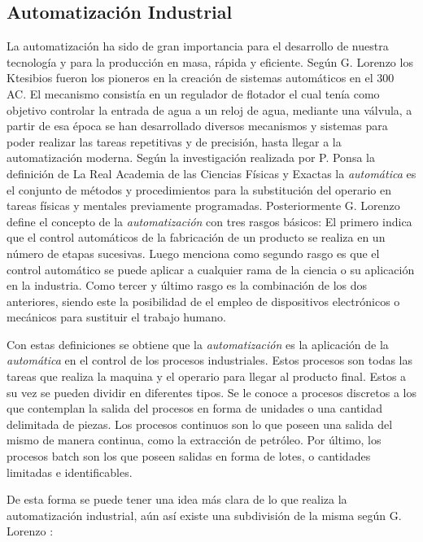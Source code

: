 \subsection*{Automatización Industrial}

La automatización ha sido de gran importancia para el desarrollo de nuestra tecnología y para la producción en masa, rápida y eficiente. Según G. Lorenzo \cite{lorenzo2009automatizacion} los Ktesibios fueron los pioneros en la creación de sistemas automáticos en el 300 AC. El mecanismo consistía en un regulador de flotador el cual tenía como objetivo controlar la entrada de agua a un reloj de agua, mediante una válvula, a partir de esa época se han desarrollado diversos mecanismos y sistemas para poder realizar las tareas repetitivas y de precisión, hasta llegar a la automatización moderna. Según la investigación realizada por P. Ponsa \cite{ponsa2009diseno} la definición de La Real Academia de las Ciencias Físicas y Exactas la \textit{automática} es el conjunto de métodos y procedimientos para la substitución del operario en tareas físicas y mentales previamente programadas. Posteriormente G. Lorenzo \cite{lorenzo2009automatizacion} define el concepto de la \textit{automatización} con tres rasgos básicos: El primero indica que el control automáticos de la fabricación de un producto se realiza en un número de etapas sucesivas. Luego menciona como segundo rasgo es que el control automático se puede aplicar a cualquier rama de la ciencia o su aplicación en la industria. Como tercer y último rasgo es la combinación de los dos anteriores, siendo este la posibilidad de el empleo de dispositivos electrónicos o mecánicos para sustituir el trabajo humano.

Con estas definiciones se obtiene que la \textit{automatización} es la aplicación de la \textit{automática} en el control de los procesos industriales. Estos procesos son todas las tareas que realiza la maquina y el operario para llegar al producto final. Estos a su vez se pueden dividir en diferentes tipos. Se le conoce a procesos discretos a los que contemplan la salida del procesos en forma de unidades o una cantidad delimitada de piezas. Los procesos continuos son lo que poseen una salida del mismo de manera continua, como la extracción de petróleo. Por último, los procesos batch son los que poseen salidas en forma de lotes, o cantidades limitadas e identificables.

De esta forma se puede tener una idea más clara de lo que realiza la automatización industrial, aún así existe una subdivisión de la misma según G. Lorenzo \cite{lorenzo2009automatizacion}:


